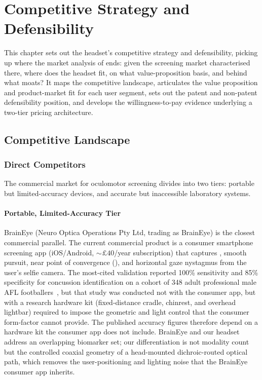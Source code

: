 \chapter{Competitive Strategy and Defensibility}
\label{chapter:ent-competitive}


This chapter sets out the headset's competitive strategy and defensibility, picking up where the market analysis of  ends: given the  screening market characterised there, where does the headset fit, on what value-proposition basis, and behind what moats? It maps the competitive landscape, articulates the value proposition and product-market fit for each user segment, sets out the patent and non-patent defensibility position, and develops the willingness-to-pay evidence underlying a two-tier pricing architecture.


\section{Competitive Landscape}
\label{sec:ent-competitive-landscape}


\subsection{Direct Competitors}
\label{sec:ent-direct-competitors}

The commercial market for oculomotor screening divides into two tiers: portable but limited-accuracy devices, and accurate but inaccessible laboratory systems.

\subsubsection*{Portable, Limited-Accuracy Tier}

BrainEye (Neuro Optica Operations Pty Ltd, trading as BrainEye) is the closest commercial parallel. The current commercial product is a consumer smartphone screening app (iOS/Android, ${\sim}\pounds 40$/year subscription) that captures , smooth pursuit, near point of convergence (), and horizontal gaze nystagmus from the user's selfie camera. The most-cited validation reported 100\% sensitivity and 85\% specificity for concussion identification on a cohort of 348 adult professional male AFL footballers~\cite{clough2025braineye}, but that study was conducted not with the consumer app, but with a research hardware kit (fixed-distance cradle, chinrest, and overhead lightbar) required to impose the geometric and light control that the consumer form-factor cannot provide. The published accuracy figures therefore depend on a hardware kit the consumer app does not include. BrainEye and our headset address an overlapping biomarker set; our differentiation is not modality count but the controlled coaxial geometry of a head-mounted dichroic-routed optical path, which removes the user-positioning and lighting noise that the BrainEye consumer app inherits.

